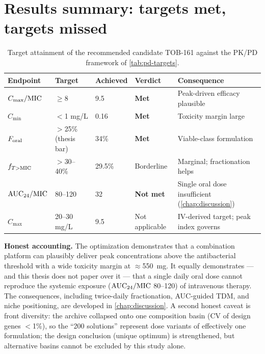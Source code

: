 \section{Results summary: targets met, targets missed}
\label{sec:ch4-summary}
\begin{table}[htbp]
\centering
\caption{Target attainment of the recommended candidate TOB-161 against the PK/PD framework of \cref{tab:pd-targets}.}
\label{tab:targets}
\small
\begin{tabular}{p{2.4cm}p{2.2cm}p{1.6cm}p{2.0cm}p{5.6cm}}
\toprule
Endpoint & Target & Achieved & Verdict & Consequence\\
\midrule
$C_{\max}/\mathrm{MIC}$ & $\geq$8 & 9.5 & \textbf{Met} & Peak-driven efficacy plausible\\
$C_{\min}$ & $<$1 mg/L & 0.16 & \textbf{Met} & Toxicity margin large\\
$F_{\mathrm{oral}}$ & $>$25\% (thesis bar) & 34\% & \textbf{Met} & Viable-class formulation\\
$f_{T>\mathrm{MIC}}$ & $>$30--40\% & 29.5\% & Borderline & Marginal; fractionation helps\\
$\mathrm{AUC}_{24}/\mathrm{MIC}$ & 80--120 & 32 & \textbf{Not met} & Single oral dose insufficient (\cref{chap:discussion})\\
$C_{\max}$ & 20--30 mg/L & 9.5 & Not applicable & IV-derived target; peak index governs\\
\bottomrule
\end{tabular}
\end{table}

\textbf{Honest accounting.} The optimization demonstrates that a combination platform can plausibly deliver peak concentrations above the antibacterial threshold with a wide toxicity margin at $\approx$550~mg. It equally demonstrates --- and this thesis does not paper over it --- that a single daily oral dose cannot reproduce the systemic exposure ($\mathrm{AUC}_{24}/\mathrm{MIC}$ 80--120) of intravenous therapy. The consequences, including twice-daily fractionation, AUC-guided TDM, and niche positioning, are developed in \cref{chap:discussion}. A second honest caveat is front diversity: the archive collapsed onto one composition basin (CV of design genes $<$1\%), so the ``200 solutions'' represent dose variants of effectively one formulation; the design conclusion (unique optimum) is strengthened, but alternative basins cannot be excluded by this study alone.
